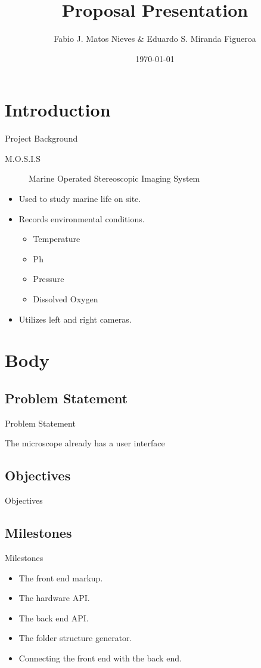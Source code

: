 \documentclass[14pt, aspectratio=169]{beamer}
\title{Proposal Presentation}
\author{Fabio J. Matos Nieves \& Eduardo S. Miranda Figueroa}
\institute{Univerity of Puerto Rico Mayagüez Campus}
\date{\today}
\begin{document}
\maketitle
\begin{frame}
 \tableofcontents 
\end{frame}
\section{Introduction}
\begin{frame}{Project Background}
  \begin{description}
   \item[M.O.S.I.S] Marine Operated Stereoscopic Imaging System 
   \end{description}
   \begin{itemize}
   \item Used to study marine life on site.
   \item Records environmental conditions.
     \begin{itemize}
     \item Temperature
     \item Ph
     \item Pressure
     \item Dissolved Oxygen
     \end{itemize}
     \item Utilizes left and right cameras.
   \end{itemize}
\end{frame}
\section{Body}
\subsection{Problem Statement}
\begin{frame}{Problem Statement}
  \item The microscope already has a user interface
\end{frame}
\subsection{Objectives}
\begin{frame}{Objectives}
  
\end{frame}
\subsection{Milestones}
\begin{frame}{Milestones}
  \begin{itemize}
  \item The front end markup.
  \item The hardware API.
  \item The back end API.
  \item The folder structure generator.
  \item Connecting the front end with the back end.
  \end{itemize}
\end{frame}
\end{document}
